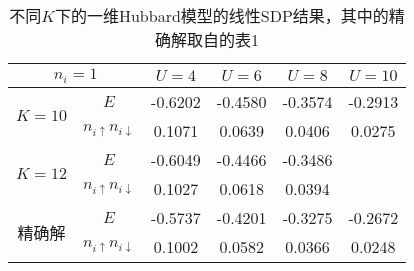 
\begin{table}
    \caption{不同$K$下的一维Hubbard模型的线性SDP结果，其中的精确解取自\parencite{han_manybody}的表1}
    \label{tbl:hubbard-1d-linear-sdp}
    \centering
    \begin{tabular}{cccccc}
        \toprule
        \multicolumn{2}{c}{$n_i=1$}                                 & $U=4$   & $U=6$   & $U=8$   & $U=10$  \\
        \midrule
        \multirow{2}{*}{$K=10$} & $E$                               & -0.6202 & -0.4580 & -0.3574 & -0.2913  \\
                                & $n_{i \uparrow} n_{i \downarrow}$ &  0.1071 &  0.0639 &  0.0406 &  0.0275 \\
        \midrule
        \multirow{2}{*}{$K=12$} & $E$                               & -0.6049 & -0.4466 & -0.3486 &         \\
                                & $n_{i \uparrow} n_{i \downarrow}$ &  0.1027 &  0.0618 &  0.0394 &         \\
        \midrule
        \multirow{2}{*}{精确解}  & $E$                               & -0.5737 & -0.4201 & -0.3275 & -0.2672  \\
                                & $n_{i \uparrow} n_{i \downarrow}$ &  0.1002 &  0.0582 &  0.0366 &  0.0248  \\
        \bottomrule
    \end{tabular}
\end{table}